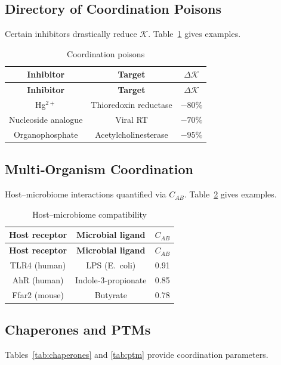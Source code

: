 \documentclass[12pt,a4paper]{article}
\newcommand{\REL}{\mathcal{K}}          %
\begin{document}
	\subsection{Directory of Coordination Poisons}
	Certain inhibitors drastically reduce \(\REL\). Table~\ref{tab:poisons} gives examples.
	
	\begin{longtable}{|c|c|c|}
		\caption{Coordination poisons}\label{tab:poisons}\\
		\hline
		\textbf{Inhibitor} & \textbf{Target} & \(\Delta \REL\) \\
		\hline
		\endfirsthead
		\hline
		\textbf{Inhibitor} & \textbf{Target} & \(\Delta \REL\) \\
		\hline
		\endhead
		\hline
		Hg\(^{2+}\) & Thioredoxin reductase & \(-80\%\) \\
		Nucleoside analogue & Viral RT & \(-70\%\) \\
		Organophosphate & Acetylcholinesterase & \(-95\%\) \\
		\hline
	\end{longtable}
	
	\subsection{Multi‑Organism Coordination}
	Host–microbiome interactions quantified via \(C_{AB}\). Table~\ref{tab:microbiome} gives examples.
	
	\begin{longtable}{|c|c|c|}
		\caption{Host–microbiome compatibility}\label{tab:microbiome}\\
		\hline
		\textbf{Host receptor} & \textbf{Microbial ligand} & \(C_{AB}\) \\
		\hline
		\endfirsthead
		\hline
		\textbf{Host receptor} & \textbf{Microbial ligand} & \(C_{AB}\) \\
		\hline
		\endhead
		\hline
		TLR4 (human) & LPS (E.\ coli) & 0.91 \\
		AhR (human) & Indole‑3‑propionate & 0.85 \\
		Ffar2 (mouse) & Butyrate & 0.78 \\
		\hline
	\end{longtable}
	
	\subsection{Chaperones and PTMs}
	Tables~\ref{tab:chaperones} and \ref{tab:ptm} provide coordination parameters.
	
\end{document}
